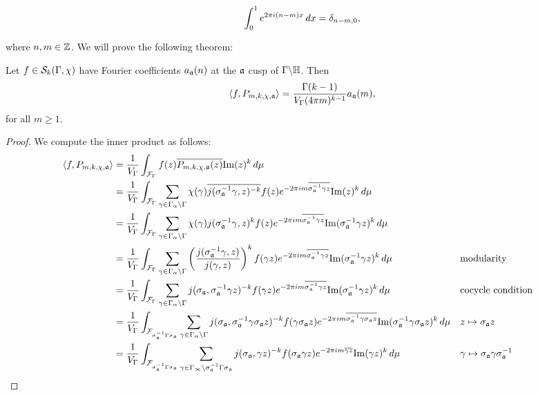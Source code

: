     \begin{equation}\label{equ:Dirac_integral_representation}
      \int_{0}^{1}e^{2\pi i(n-m)x}\,dx = \delta_{n-m,0},
    \end{equation}

    where $n,m \in \mathbb{Z}$. We will prove the following theorem:

    \begin{theorem}\label{thm:Petersson_inner_product_with_Poincare_series}
      Let $f \in \mathcal{S}_{k}(\Gamma,\chi)$ have Fourier coefficients $a_{\mathfrak{a}}(n)$ at the $\mathfrak{a}$ cusp of $\Gamma\backslash\mathbb{H}$. Then 
      \[
        \langle f,P_{m,k,\chi,\mathfrak{a}}\rangle = \frac{\Gamma(k-1)}{V_{\Gamma}(4\pi m)^{k-1}}a_{\mathfrak{a}}(m),
      \]
      for all $m \ge 1$.
    \end{theorem}
    \begin{proof}
      We compute the inner product as follows:
      \begin{align*}
        \<f,P_{m,k,\chi,\mf{a}}\> &= \frac{1}{V_{\G}}\int_{\mc{F}_{\G}}f(z)\conj{P_{m,k,\chi,\mf{a}}(z)}\Im(z)^{k}\,d\mu \\
        &= \frac{1}{V_{\G}}\int_{\mc{F}_{\G}}\sum_{\g \in \G_{\a}\backslash\G}\chi(\g)\conj{j(\s_{\mf{a}}^{-1}\g,z)^{-k}}f(z)e^{-2\pi im\conj{\s_{\mf{a}}^{-1}\g z}}\Im(z)^{k}\,d\mu \\
        &= \frac{1}{V_{\G}}\int_{\mc{F}_{\G}}\sum_{\g \in \G_{\a}\backslash\G}\chi(\g)j(\s_{\mf{a}}^{-1}\g,z)^{k}f(z)e^{-2\pi im\conj{\s_{\mf{a}}^{-1}\g z}}\Im(\s_{\mf{a}}^{-1}\g z)^{k}\,d\mu \\
        &= \frac{1}{V_{\G}}\int_{\mc{F}_{\G}}\sum_{\g \in \G_{\a}\backslash\G}\left(\frac{j(\s_{\mf{a}}^{-1}\g,z)}{j(\g,z)}\right)^{k}f(\g z)e^{-2\pi im\conj{\s_{\mf{a}}^{-1}\g z}}\Im(\s_{\mf{a}}^{-1}\g z)^{k}\,d\mu && \text{modularity} \\
        &= \frac{1}{V_{\G}}\int_{\mc{F}_{\G}}\sum_{\g \in \G_{\a}\backslash\G}j(\s_{\mf{a}},\s_{\mf{a}}^{-1}\g z)^{-k}f(\g z)e^{-2\pi im\conj{\s_{\mf{a}}^{-1}\g z}}\Im(\s_{\mf{a}}^{-1}\g z)^{k}\,d\mu && \text{cocycle condition} \\
        &= \frac{1}{V_{\G}}\int_{\mc{F}_{\s_{\mf{a}}^{-1}\G\s_{\mf{a}}}}\sum_{\g \in \G_{\a}\backslash\G}j(\s_{\mf{a}},\s_{\mf{a}}^{-1}\g\s_{\mf{a}}z)^{-k}f(\g\s_{\mf{a}}z)e^{-2\pi im\conj{\s_{\mf{a}}^{-1}\g\s_{\mf{a}}z}}\Im(\s_{\mf{a}}^{-1}\g\s_{\mf{a}}z)^{k}\,d\mu && \text{$z \mapsto \s_{\mf{a}}z$} \\
        &= \frac{1}{V_{\G}}\int_{\mc{F}_{\s_{\mf{a}}^{-1}\G\s_{\mf{a}}}}\sum_{\g \in \G_{\infty}\backslash\s_{\mf{a}}^{-1}\G\s_{\mf{a}}}j(\s_{\mf{a}},\g z)^{-k}f(\s_{\mf{a}}\g z)e^{-2\pi im\conj{\g z}}\Im(\g z)^{k}\,d\mu && \text{$\g \mapsto \s_{\mf{a}}\g\s_{\mf{a}}^{-1}$} \\

\end{align*}
\end{proof}
